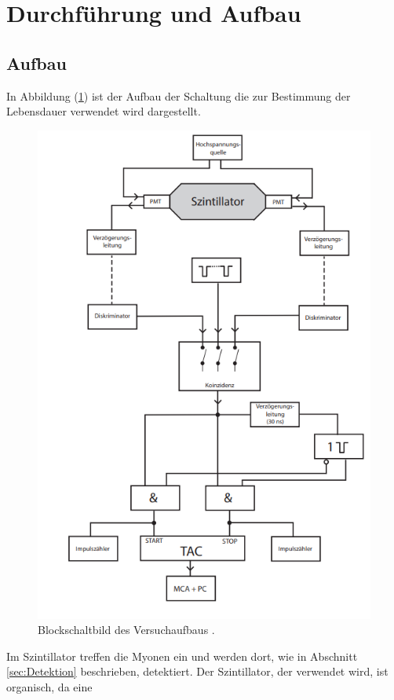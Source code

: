 \section{Durchführung und Aufbau}
\label{sec:Durchführung}
\subsection{Aufbau}
In Abbildung (\ref{fig:aufbau}) ist der Aufbau der Schaltung die zur Bestimmung der Lebensdauer verwendet wird dargestellt.
\begin{figure}
	\centering
	\includegraphics[scale=0.5]{fig/aufbau.png}
	\caption{Blockschaltbild des Versuchaufbaus \cite[3]{Anleitung}.}
	\label{fig:aufbau}
\end{figure}
\FloatBarrier
\noindent Im Szintillator treffen die Myonen ein und werden dort, wie in Abschnitt \ref{sec:Detektion} beschrieben, detektiert. Der Szintillator, der verwendet wird, ist organisch, da eine
